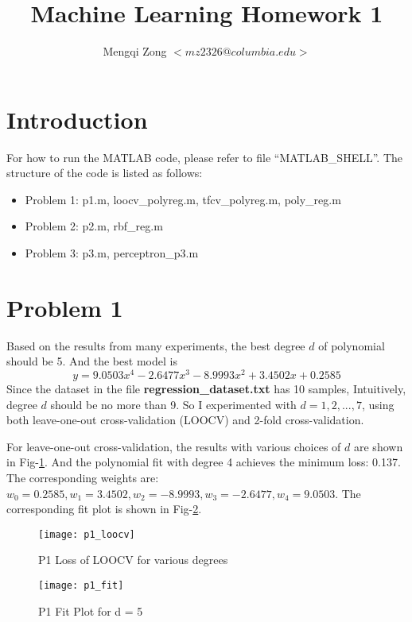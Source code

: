 \documentclass[12pt]{article}
\title{Machine Learning Homework 1}
\author{Mengqi Zong $<mz2326@columbia.edu>$}
\begin{document}
\maketitle

\section{Introduction}

For how to run the MATLAB code, please refer to file ``MATLAB\_SHELL''. The structure of the code is listed as follows:
\begin{itemize}
  \item Problem 1:
    p1.m, loocv\_polyreg.m, tfcv\_polyreg.m, poly\_reg.m
  \item Problem 2:
    p2.m, rbf\_reg.m
  \item Problem 3:
    p3.m, perceptron\_p3.m
\end{itemize}

\section{Problem 1}

Based on the results from many experiments, the best degree $d$ of polynomial should be 5. And the best model is
\begin{equation*}
  y = 9.0503 x^4 - 2.6477 x^3 - 8.9993 x^2 + 3.4502 x + 0.2585
\end{equation*}
Since the dataset in the file {\bf regression\_dataset.txt} has 10 samples, Intuitively, degree $d$ should be no more than 9. So I experimented with $d = 1, 2, ..., 7$, using both leave-one-out cross-validation (LOOCV) and 2-fold cross-validation.

For leave-one-out cross-validation, the results with various choices of $d$ are shown in Fig-\ref{fig:p1_loocv}. And the polynomial fit with degree 4 achieves the minimum loss: 0.137. The corresponding weights are: $w_0 = 0.2585, w_1 = 3.4502, w_2 = -8.9993, w_3 = -2.6477, w_4 = 9.0503$. The corresponding fit plot is shown in Fig-\ref{fig:p1_fit}.

\begin{figure}[ht!]
  \centering
  \texttt{[image: p1\_loocv]}
  \caption{P1 Loss of LOOCV for various degrees \label{fig:p1_loocv}}
\end{figure}

\begin{figure}[ht!]
  \centering
  \texttt{[image: p1\_fit]}
  \caption{P1 Fit Plot for d = 5 \label{fig:p1_fit}}
\end{figure}
\end{document}
